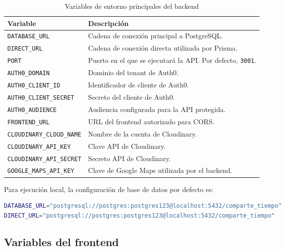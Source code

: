 \begin{table}[htbp]
\centering
\begin{adjustbox}{max width=\textwidth}
\begin{tabular}{|p{4.5cm}|p{8cm}|}
\hline
\textbf{Variable} & \textbf{Descripción} \\ \hline
\texttt{DATABASE\_URL} & Cadena de conexión principal a PostgreSQL. \\ \hline
\texttt{DIRECT\_URL} & Cadena de conexión directa utilizada por Prisma. \\ \hline
\texttt{PORT} & Puerto en el que se ejecutará la API. Por defecto, \texttt{3001}. \\ \hline
\texttt{AUTH0\_DOMAIN} & Dominio del tenant de Auth0. \\ \hline
\texttt{AUTH0\_CLIENT\_ID} & Identificador de cliente de Auth0. \\ \hline
\texttt{AUTH0\_CLIENT\_SECRET} & Secreto del cliente de Auth0. \\ \hline
\texttt{AUTH0\_AUDIENCE} & Audiencia configurada para la API protegida. \\ \hline
\texttt{FRONTEND\_URL} & URL del frontend autorizado para CORS. \\ \hline
\texttt{CLOUDINARY\_CLOUD\_NAME} & Nombre de la cuenta de Cloudinary. \\ \hline
\texttt{CLOUDINARY\_API\_KEY} & Clave API de Cloudinary. \\ \hline
\texttt{CLOUDINARY\_API\_SECRET} & Secreto API de Cloudinary. \\ \hline
\texttt{GOOGLE\_MAPS\_API\_KEY} & Clave de Google Maps utilizada por el backend. \\ \hline
\end{tabular}
\end{adjustbox}
\caption{Variables de entorno principales del backend}
\label{tab:variables_entorno_backend}
\end{table}

Para ejecución local, la configuración de base de datos por defecto es:

\begin{lstlisting}[language=bash, caption={Variables de base de datos local}, label={lst:manual_instalacion_database_env}]
DATABASE_URL="postgresql://postgres:postgres123@localhost:5432/comparte_tiempo"
DIRECT_URL="postgresql://postgres:postgres123@localhost:5432/comparte_tiempo"
\end{lstlisting}

\subsection{Variables del frontend}

